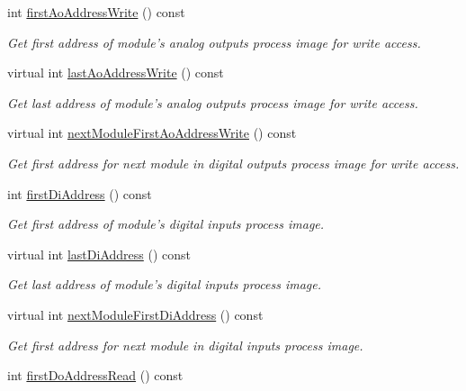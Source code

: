 \begin{DoxyCompactItemize}
int \hyperlink{classmdt_device_modbus_wago_module_af8b6d9549c820869b09a77ae01e9bf3f}{first\-Ao\-Address\-Write} () const 
\begin{DoxyCompactList}\small\item\em Get first address of module's analog outputs process image for write access. \end{DoxyCompactList}\item 
virtual int \hyperlink{classmdt_device_modbus_wago_module_a28f969d1c4fa51a85ee335e44ff012b7}{last\-Ao\-Address\-Write} () const 
\begin{DoxyCompactList}\small\item\em Get last address of module's analog outputs process image for write access. \end{DoxyCompactList}\item 
virtual int \hyperlink{classmdt_device_modbus_wago_module_a51b519af4518c16be937fa55b458bf8e}{next\-Module\-First\-Ao\-Address\-Write} () const 
\begin{DoxyCompactList}\small\item\em Get first address for next module in digital outputs process image for write access. \end{DoxyCompactList}\item 
int \hyperlink{classmdt_device_modbus_wago_module_a2229734519a6168e459115a87c7caa5c}{first\-Di\-Address} () const 
\begin{DoxyCompactList}\small\item\em Get first address of module's digital inputs process image. \end{DoxyCompactList}\item 
virtual int \hyperlink{classmdt_device_modbus_wago_module_af39bda468cf9fa967aaa5c052ae14d81}{last\-Di\-Address} () const 
\begin{DoxyCompactList}\small\item\em Get last address of module's digital inputs process image. \end{DoxyCompactList}\item 
virtual int \hyperlink{classmdt_device_modbus_wago_module_ad789bd289b2969f4c8291dd4f5c543c0}{next\-Module\-First\-Di\-Address} () const 
\begin{DoxyCompactList}\small\item\em Get first address for next module in digital inputs process image. \end{DoxyCompactList}\item 
int \hyperlink{classmdt_device_modbus_wago_module_ac7279bc692cba522a5e06abfec5012a9}{first\-Do\-Address\-Read} () const 

\end{DoxyCompactItemize}
